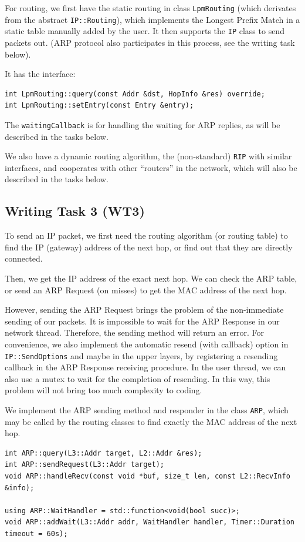 \documentclass[a4paper]{article}
\begin{document}
  For routing, we first have the static routing in class \texttt{LpmRouting} (which derivates from the abstract \texttt{IP::Routing}), which implements the Longest Prefix Match in a static table manually added by the user.
  It then supports the \texttt{IP} class to send packets out. (ARP protocol also participates in this process, see the writing task below).

  It has the interface:
  \begin{verbatim}
int LpmRouting::query(const Addr &dst, HopInfo &res) override;
int LpmRouting::setEntry(const Entry &entry);
  \end{verbatim}
  The \texttt{waitingCallback} is for handling the waiting for ARP replies, as will be described in the tasks below.

  We also have a dynamic routing algorithm, the (non-standard) \texttt{RIP} with similar interfaces, and cooperates with other ``routers'' in the network, which will also be described in the tasks below.

  \subsection{Writing Task 3 (WT3)}

  To send an IP packet, we first need the routing algorithm (or routing table) to find the IP (gateway) address of the next hop, or find out that they are directly connected.

  Then, we get the IP address of the exact next hop.
  We can check the ARP table, or send an ARP Request (on misses) to get the MAC address of the next hop.

  However, sending the ARP Request brings the problem of the non-immediate sending of our packets.
  It is impossible to wait for the ARP Response in our network thread.
  Therefore, the sending method will return an error.
  For convenience, we also implement the automatic resend (with callback) option in \texttt{IP::SendOptions} and maybe in the upper layers, by registering a resending callback in the ARP Response receiving procedure.
  In the user thread, we can also use a mutex to wait for the completion of resending.
  In this way, this problem will not bring too much complexity to coding.

  We implement the ARP sending method and responder in the class \texttt{ARP}, which may be called by the routing classes to find exactly the MAC address of the next hop.
  \begin{verbatim}
int ARP::query(L3::Addr target, L2::Addr &res);
int ARP::sendRequest(L3::Addr target);
void ARP::handleRecv(const void *buf, size_t len, const L2::RecvInfo &info);

using ARP::WaitHandler = std::function<void(bool succ)>;
void ARP::addWait(L3::Addr addr, WaitHandler handler, Timer::Duration timeout = 60s);
  \end{verbatim}
\end{document}
